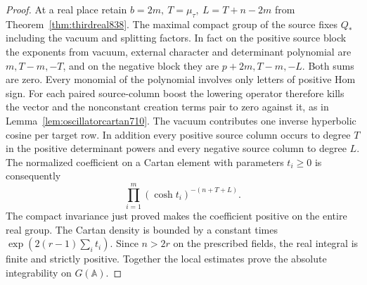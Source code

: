 \documentclass[a4paper,11pt]{article}
\theoremstyle{definition}
\theoremstyle{remark}
\numberwithin{equation}{section}
\begin{document}
\begin{proof}
At a real place retain \(b=2m,\ T=\mu_\tau,\ L=T+n-2m\)
from Theorem~\ref{thm:thirdreal838}. The maximal compact
group of the source fixes \(Q_*\) including the vacuum and
splitting factors. In fact on the positive source block
the exponents from vacuum, external character and determinant
polynomial are \(m,T-m,-T\), and on the negative block they
are \(p+2m,T-m,-L\). Both sums are zero. Every monomial of
the polynomial involves only letters of positive Hom sign.
For each paired source-column boost the lowering operator
therefore kills the vector and the nonconstant creation
terms pair to zero against it, as in
Lemma~\ref{lem:oscillatorcartan710}. The vacuum contributes
one inverse hyperbolic cosine per target row. In addition
every positive source column occurs to degree \(T\) in the
positive determinant powers and every negative source column
to degree \(L\). The normalized coefficient on a Cartan
element with parameters \(t_i\ge0\) is consequently
\[
                  \prod_{i=1}^m(\cosh t_i)^{-(n+T+L)}.
\]
The compact invariance just proved makes the coefficient
positive on the entire real group. The Cartan density is
bounded by a constant times \(\exp(2(r-1)\sum_i t_i)\).
Since \(n>2r\) on the prescribed fields, the real integral
is finite and strictly positive. Together the local estimates
prove the absolute integrability on \(G(\mathbb A)\).
\end{proof}
\end{document}
